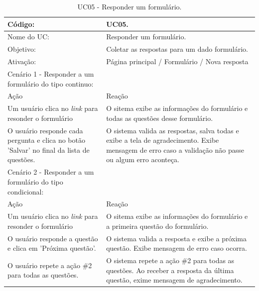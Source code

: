 \documentclass[11pt]{article}
\begin{document}
        \begin{table}[h]
          \begin{center}
            \begin{tabular}{ | p{7cm} | p{8cm} | }
              \hline
              Código: \cellcolor{gray} & UC05. \\
              \hline
              Nome do UC: \cellcolor{gray} & Responder um formulário. \\
              \hline
              Objetivo: \cellcolor{gray} & Coletar as respostas para um dado formulário. \\
              \hline
              Ativação: \cellcolor{gray} & Página principal / Formulário / Nova resposta \\
              \hline
              \hline
              Cenário 1 - Responder a um formulário do tipo continuo: &  \\
              \hline
              Ação\cellcolor{gray} & Reação\cellcolor{gray} \\
              \hline
              Um usuário clica no {\em link} para resonder o formulário & O sitema exibe as informações do formulário e todas as questões desse formulário. \\
              \hline
              O usuário responde cada pergunta e clica no botão 'Salvar' no final da lista de questões. & O sistema valida as respostas, salva todas e exibe a tela de agradecimento. Exibe mensagem de erro caso a validação não passe ou algum erro aconteça. \\
              \hline
              \hline              
              Cenário 2 - Responder a um formulário do tipo condicional: &  \\
              \hline
              Ação\cellcolor{gray} & Reação\cellcolor{gray} \\
              \hline
              Um usuário clica no {\em link} para resonder o formulário & O sitema exibe as informações do formulário e a primeira questão do formulário. \\
              \hline
              O usuário responde a questão e clica em 'Próxima questão'. & O sistema valida a resposta e exibe a próxima questão. Exibe mensagem de erro caso ocorra. \\
              \hline
              O usuário repete a ação \#2 para todas as questões. & O sistema repete a ação \#2 para todas as questões. Ao receber a resposta da última questão, exime mensagem de agradecimento. \\
              \hline
            \end{tabular}
            \caption{UC05 - Responder um formulário.}
          \end{center}
        \end{table}
        
\end{document}
